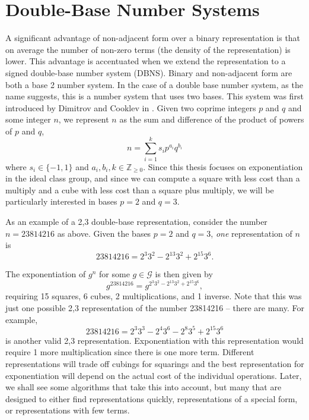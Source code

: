 \documentclass{ucalgthes1}
\theoremstyle{plain}
\theoremstyle{definition}
\newcommand{\ZZgez}{\mathbb{Z}_{\ge 0}}
\begin{document}
\bigbreak
\section{Double-Base Number Systems}\label{section:dbns}

A significant advantage of non-adjacent form over a binary representation is that on average the number of non-zero terms (the density of the representation) is lower.  This advantage is accentuated when we extend the representation to a signed double-base number system (DBNS).  Binary and non-adjacent form are both a base 2 number system.  In the case of a double base number system, as the name suggests, this is a number system that uses two bases.  This system was first introduced by Dimitrov and Cooklev in \cite{Dimitrov1995}.  Given two coprime integers $p$ and $q$ and some integer $n$, we represent $n$ as the sum and difference of the product of powers of $p$ and $q$,
\begin{equation}\label{eq:generalDbnsForm}
	n = \sum_{i=1}^k s_i p^{a_i} q^{b_i}
\end{equation}
where $s_i \in \{-1, 1\}$ and $a_i, b_i, k \in \ZZgez$.  Since this thesis focuses on exponentiation in the ideal class group, and since we can compute a square with less cost than a multiply and a cube with less cost than a square plus multiply, we will be particularly interested in bases $p=2$ and $q=3$.

As an example of a 2,3 double-base representation, consider the number $n=23814216$ as above.  Given the bases $p=2$ and $q=3$, \emph{one} representation of $n$ is
\begin{equation}\label{eq:chainedEg}
	23814216 = 2^3 3^2 -2^{13} 3^2 +2^{15} 3^6.
\end{equation}

The exponentiation of $g^n$ for some $g \in \mathcal G$ is then given by
\[
	g^{23814216} = g^{2^3 3^2 -2^{13} 3^2 +2^{15} 3^6},
\]
requiring 15 squares, 6 cubes, 2 multiplications, and 1 inverse.  Note that this was just one possible 2,3 representation of the number 23814216 -- there are many.  For example,
\begin{equation}\label{eq:unchainedEg}
	23814216 = 2^3 3^3 - 2^4 3^6 - 2^8 3^5 + 2^{15} 3^6
\end{equation}
is another valid 2,3 representation.  Exponentiation with this representation would require 1 more multiplication since there is one more term.  Different representations will trade off cubings for squarings and the best representation for exponentiation will depend on the actual cost of the individual operations.  Later, we shall see some algorithms that take this into account, but many that are designed to either find representations quickly, representations of a special form, or representations with few terms.
\end{document}
